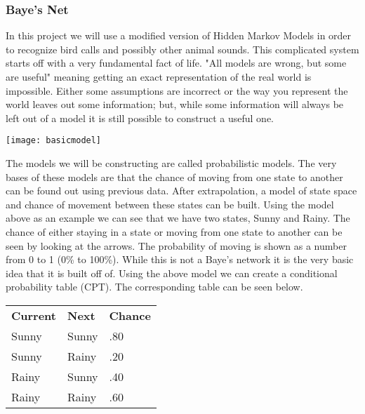 \subsubsection{Baye's Net}
In this project we will use a modified version of Hidden Markov Models in order to recognize bird calls and possibly other animal sounds. This complicated system starts off with a very fundamental fact of life. "All models are wrong, but some are useful" meaning getting an exact representation of the real world is impossible. Either some assumptions are incorrect or the way you represent the world leaves out some information; but, while some information will always be left out of a model it is still possible to construct a useful one. 
\begin{center}
\texttt{[image: basicmodel]}
\end{center}

\par The models we will be constructing are called probabilistic models. The very bases of these models are that the chance of moving from one state to another can be found out using previous data. After extrapolation, a model of state space and chance of movement between these states can be built. Using the model above as an example we can see that we have two states, Sunny and Rainy. The chance of either staying in a state or moving from one state to another can be seen by looking at the arrows. The probability of moving is shown as a number from 0 to 1 (0\% to 100\%). While this is not a Baye's network it is the very basic idea that it is built off of. Using the above model we can create a conditional probability table (CPT). The corresponding table can be seen below.\newline
\begin{center}
\begin{table}[]
	\begin{tabular}{lll}
		\textbf{Current} & \textbf{Next} & \textbf{Chance} \\
		Sunny            & Sunny         & .80             \\
		Sunny            & Rainy         & .20             \\
		Rainy            & Sunny         & .40             \\
		Rainy            & Rainy         & .60            
	\end{tabular}
\end{table}
\end{center}
 




